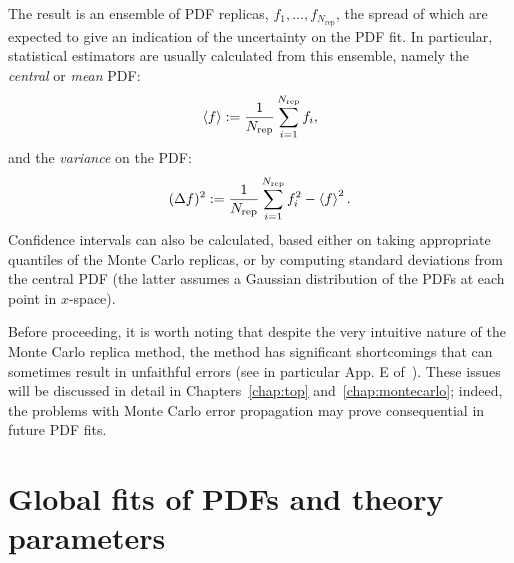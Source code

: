 \documentclass[withindex,glossary]{cam-thesis}
\begin{document}
The result is an ensemble of PDF replicas, $f_1,..., f_{N_{\text{rep}}}$, the spread of which are expected to give an indication of the uncertainty on the PDF fit. In particular, statistical estimators are usually calculated from this ensemble, namely the \textit{central} or \textit{mean} PDF:
\begin{equation}
\braket{f} := \frac{1}{N_{\text{rep}}}\sum_{i=1}^{N_{\text{rep}}} f_i,
\end{equation}
and the \textit{variance} on the PDF:
\begin{equation}
(\Delta f)^2 := \frac{1}{N_{\text{rep}}} \sum_{i=1}^{N_{\text{rep}}} f_i^2 - \braket{f}^2.
\end{equation}
Confidence intervals can also be calculated, based either on taking appropriate quantiles of the Monte Carlo replicas, or by computing standard deviations from the central PDF (the latter assumes a Gaussian distribution of the PDFs at each point in $x$-space).

Before proceeding, it is worth noting that despite the very intuitive nature of the Monte Carlo replica method, the method has significant shortcomings that can sometimes result in unfaithful errors (see in particular App. E of~\cite{Kassabov:2023hbm}). These issues will be discussed in detail in Chapters~\ref{chap:top} and~\ref{chap:montecarlo}; indeed, the problems with Monte Carlo error propagation may prove consequential in future PDF fits.



\newpage
\section{Global fits of PDFs and theory parameters}
\label{sec:globalfits}
\end{document}
